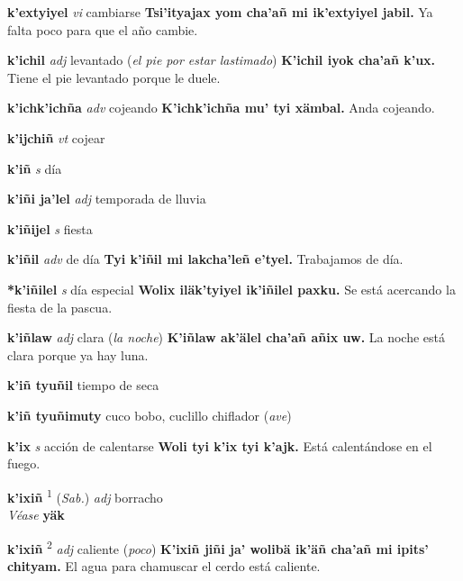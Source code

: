 \documentclass[10pt]{scrbook}
\newcommand{\entry}[1]{\textbf{#1}}
\newcommand{\defsuperscript}[1]{\textsuperscript{#1}}
\newcommand{\partofspeech}[1]{\textit{#1}}
\newcommand{\spanishtranslation}[1]{#1}
\newcommand{\clarification}[1]{(\textit{#1})}
\newcommand{\cholexample}[1]{\textbf{#1}}
\newcommand{\exampletranslation}[1]{#1}
\newcommand{\alsosee}[1]{\\\textit{Véase} \textbf{#1}}
\newcommand{\relevantdialect}[1]{(\textit{#1})}
\begin{document}
\begin{multicols}{2}
\entry{k'extyiyel}
\partofspeech{vi}
\spanishtranslation{cambiarse}
\cholexample{Tsi'ityajax yom cha'añ mi ik'extyiyel jabil.}
\exampletranslation{Ya falta poco para que el año cambie.}

\entry{k'ichil}
\partofspeech{adj}
\spanishtranslation{levantado}
\clarification{el pie por estar lastimado}
\cholexample{K'ichil iyok cha'añ k'ux.}
\exampletranslation{Tiene el pie levantado porque le duele.}

\entry{k'ichk'ichña}
\partofspeech{adv}
\spanishtranslation{cojeando}
\cholexample{K'ichk'ichña mu' tyi xämbal.}
\exampletranslation{Anda cojeando.}

\entry{k'ijchiñ}
\partofspeech{vt}
\spanishtranslation{cojear}

\entry{k'iñ}
\partofspeech{s}
\spanishtranslation{día}

\entry{k'iñi ja'lel}
\partofspeech{adj}
\spanishtranslation{temporada de lluvia}

\entry{k'iñijel}
\partofspeech{s}
\spanishtranslation{fiesta}

\entry{k'iñil}
\partofspeech{adv}
\spanishtranslation{de día}
\cholexample{Tyi k'iñil mi lakcha'leñ e'tyel.}
\exampletranslation{Trabajamos de día.}

\entry{*k'iñilel}
\partofspeech{s}
\spanishtranslation{día especial}
\cholexample{Wolix iläk'tyiyel ik'iñilel paxku.}
\exampletranslation{Se está acercando la fiesta de la pascua.}

\entry{k'iñlaw}
\partofspeech{adj}
\spanishtranslation{clara}
\clarification{la noche}
\cholexample{K'iñlaw ak'älel cha'añ añix uw.}
\exampletranslation{La noche está clara porque ya hay luna.}

\entry{k'iñ tyuñil}
\spanishtranslation{tiempo de seca}

\entry{k'iñ tyuñimuty}
\spanishtranslation{cuco bobo, cuclillo chiflador}
\clarification{ave}

\entry{k'ix}
\partofspeech{s}
\spanishtranslation{acción de calentarse}
\cholexample{Woli tyi k'ix tyi k'ajk.}
\exampletranslation{Está calentándose en el fuego.}

\entry{k'ixiñ}
\defsuperscript{1}
\relevantdialect{Sab.}
\partofspeech{adj}
\spanishtranslation{borracho}
\alsosee{yäk}

\entry{k'ixiñ}
\defsuperscript{2}
\partofspeech{adj}
\spanishtranslation{caliente}
\clarification{poco}
\cholexample{K'ixiñ jiñi ja' wolibä ik'äñ cha'añ mi ipits' chityam.}
\exampletranslation{El agua para chamuscar el cerdo está caliente.}


\end{multicols}
\end{document}

